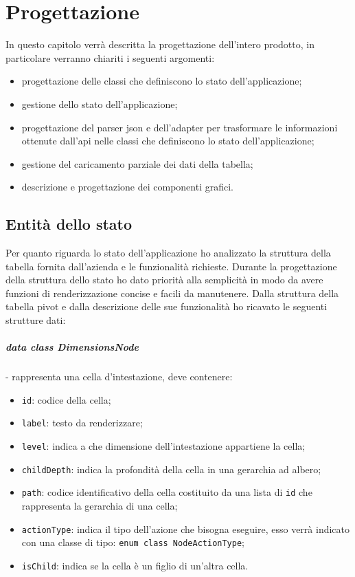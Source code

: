 
\chapter{Progettazione}
\label{cap:progettazione}

In questo capitolo verrà descritta la progettazione dell'intero prodotto, in particolare verranno chiariti i seguenti argomenti:
\begin{itemize}
	\item progettazione delle classi che definiscono lo stato dell'applicazione;
	\item gestione dello stato dell'applicazione;
	\item progettazione del parser json e dell'adapter per trasformare le informazioni ottenute dall'api nelle classi che definiscono lo stato dell'applicazione;
	\item gestione del caricamento parziale dei dati della tabella;
	\item descrizione e progettazione dei componenti grafici.
\end{itemize}

\section{Entità dello stato}
Per quanto riguarda lo stato dell'applicazione ho analizzato la struttura della tabella fornita dall'azienda e le funzionalità richieste. Durante la progettazione della struttura dello stato ho dato priorità alla semplicità in modo da avere funzioni di renderizzazione concise e facili da manutenere. Dalla struttura della tabella pivot e dalla descrizione delle sue funzionalità ho ricavato le seguenti strutture dati:

\paragraph*{data class DimensionsNode}- rappresenta una cella d'intestazione, deve contenere:
\begin{itemize}
	\item \verb|id|: codice della cella;
	\item \verb|label|: testo da renderizzare;
	\item \verb|level|: indica a che dimensione dell'intestazione appartiene la cella;
	\item \verb|childDepth|: indica la profondità della cella in una gerarchia ad albero;
	\item \verb|path|: codice identificativo della cella costituito da una lista di \verb|id| che rappresenta la gerarchia di una cella;
	\item \verb|actionType|: indica il tipo dell'azione che bisogna eseguire, esso verrà indicato con una classe di tipo: \verb|enum class NodeActionType|;
	\item \verb|isChild|: indica se la cella è un figlio di un'altra cella.
\end{itemize}


